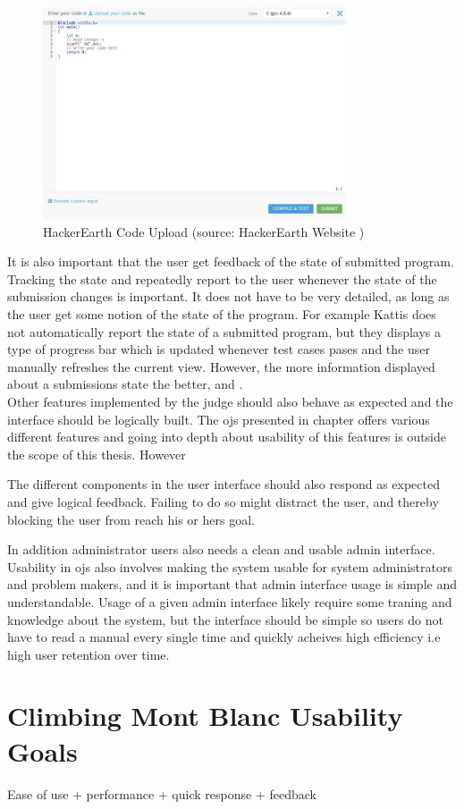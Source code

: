 \begin{figure}
    \centering
    \includegraphics[width=0.8\textwidth]{figs/hackerearth_upload.jpg}
    \caption[HackerEarth Code Upload]{HackerEarth Code Upload (source: HackerEarth Website \cite{HACKEREARTH})}
    \label{fig:hackerearth-upload}
\end{figure}

It is also important that the user get feedback of the state of submitted program. Tracking the state and repeatedly report to the user whenever the state of the submission changes is important. It does not have to be very detailed, as long as the user get some notion of the state of the program. For example Kattis does not automatically report the state of a submitted program, but they displays a type of progress bar which is updated whenever test cases pases and the user manually refreshes the current view. However, the more information displayed about a submissions state the better, and . \\

Other features implemented by the judge should also behave as expected and the interface should be logically built. The \glspl{oj} presented in chapter offers various different features and going into depth about usability of this features is outside the scope of this thesis. However 

The different components in the user interface should also respond as expected and give logical feedback. Failing to do so might distract the user, and thereby blocking the user from reach his or hers goal.

In addition administrator users also needs a clean and usable admin interface. Usability in \glspl{oj} also involves making the system usable for system administrators and problem makers, and it is important that admin interface usage is simple and understandable. Usage of a given admin interface likely require some traning and knowledge about the system, but the interface should be simple so users do not have to read a manual every single time and quickly acheives high efficiency i.e high user retention over time.

\section{Climbing Mont Blanc Usability Goals}
\label{sec:cmb-usability}
Ease of use + performance + quick response + feedback
